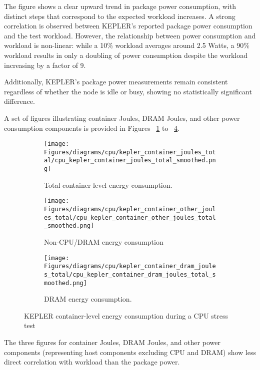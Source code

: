 The figure shows a clear upward trend in package power consumption, with distinct steps that correspond to the expected workload increases. A strong correlation is observed between KEPLER's reported package power consumption and the test workload. However, the relationship between power consumption and workload is non-linear: while a 10\% workload averages around 2.5 Watts, a 90\% workload results in only a doubling of power consumption despite the workload increasing by a factor of 9.

Additionally, KEPLER's package power measurements remain consistent regardless of whether the node is idle or busy, showing no statistically significant difference.

A set of figures illustrating container Joules, DRAM Joules, and other power consumption components is provided in Figures ~\ref{fig:cpu_kepler_container_joules_total} to ~\ref{fig:cpu_kepler_container_dram_joules_total}.

\begin{figure}[H]
    \centering
    \begin{subfigure}{1\textwidth}
        \texttt{[image: Figures/diagrams/cpu/kepler\_container\_joules\_total/cpu\_kepler\_container\_joules\_total\_smoothed.png]}
        \caption{Total container-level energy consumption.}
        \label{fig:cpu_kepler_container_joules_total}
    \end{subfigure}
    \begin{subfigure}{0.49\textwidth}
        \texttt{[image: Figures/diagrams/cpu/kepler\_container\_other\_joules\_total/cpu\_kepler\_container\_other\_joules\_total\_smoothed.png]}
        \caption{Non-CPU/DRAM energy consumption}
        \label{fig:cpu_kepler_container_other_joules_total}
    \end{subfigure}
    \begin{subfigure}{0.49\textwidth}
        \texttt{[image: Figures/diagrams/cpu/kepler\_container\_dram\_joules\_total/cpu\_kepler\_container\_dram\_joules\_total\_smoothed.png]}
        \caption{DRAM energy consumption.}
        \label{fig:cpu_kepler_container_dram_joules_total}
    \end{subfigure}
    \caption[Container-Level Energy Consumption]{KEPLER container-level energy consumption during a CPU stress test}
\end{figure}

The three figures for container Joules, DRAM Joules, and other power components (representing host components excluding CPU and DRAM) show less direct correlation with workload than the package power. 

